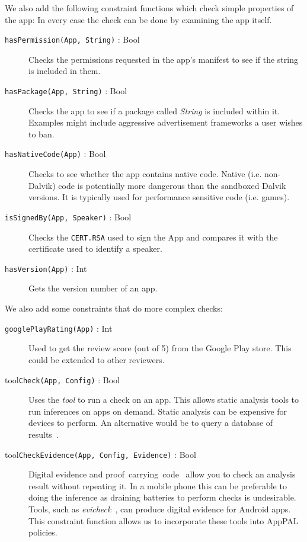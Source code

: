 \documentclass[a4paper]{scrartcl}
\begin{document}
We also add the following constraint functions which check simple properties of the app:
In every case the check can be done by examining the app itself.
\begin{description}
  \item[\texttt{hasPermission(App, String)} : Bool]
    Checks the permissions requested in the app's manifest to see if the string is included in them.

  \item[\texttt{hasPackage(App, String)} : Bool]
    Checks the app to see if a package called \emph{String} is included within it.
    Examples might include aggressive advertisement frameworks a user wishes to ban.

  \item[\texttt{hasNativeCode(App)} : Bool]
    Checks to see whether the app contains native code.
    Native (i.e. non-Dalvik) code is potentially more dangerous than the sandboxed Dalvik versions.
    It is typically used for performance sensitive code (i.e. games).

  \item[\texttt{isSignedBy(App, Speaker)} : Bool]
    Checks the \texttt{CERT.RSA} used to sign the App and compares it with the certificate used to identify a speaker.

  \item[\texttt{hasVersion(App)} : Int]
    Gets the version number of an app.
\end{description}

We also add some constraints that do more complex checks:
\begin{description}
  \item[\texttt{googlePlayRating(App)} : Int]
    Used to get the review score (out of 5) from the Google Play store.
    This could be extended to other reviewers.

  \item[tool\texttt{Check(App, Config)} : Bool]
    Uses the \emph{tool} to run a check on an app.
    This allows static analysis tools to run inferences on apps on demand.
    Static analysis can be expensive for devices to perform.
    An alternative would be to query a database of results~\citep{Noel:2014vt}.

  \item[tool\texttt{CheckEvidence(App, Config, Evidence)} : Bool]
    Digital evidence and proof~carrying~code~\citep{Necula:1996tr,Stark:2009uc} allow you to check an analysis result without repeating it.
    In a mobile phone this can be preferable to doing the inference as draining batteries to perform checks is undesirable.
    Tools, such as \emph{evicheck}~\citep{Noel:2014vt}, can produce digital evidence for Android apps.
    This constraint function allows us to incorporate these tools into AppPAL policies.
\end{description}
\end{document}
